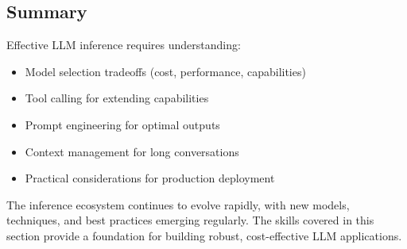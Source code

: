 \documentclass[class=article,crop=false]{standalone}
\begin{document}
\subsection{Summary}
\label{sec:inference:summary}

Effective LLM inference requires understanding:
\begin{itemize}
  \item Model selection tradeoffs (cost, performance, capabilities)
  \item Tool calling for extending capabilities
  \item Prompt engineering for optimal outputs
  \item Context management for long conversations
  \item Practical considerations for production deployment
\end{itemize}

The inference ecosystem continues to evolve rapidly, with new models, techniques, and best practices emerging regularly. The skills covered in this section provide a foundation for building robust, cost-effective LLM applications.
\end{document}
